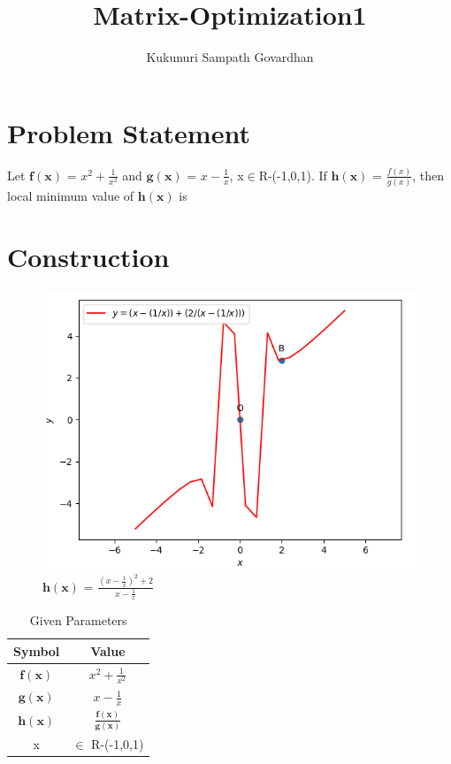 \documentclass[journal,12pt,twocolumn]{IEEEtran}
\title{
Matrix-Optimization1
}
\author{Kukunuri Sampath Govardhan}
\let\vec\mathbf
\begin{document}
\maketitle
\tableofcontents
\bigskip
\section{Problem Statement}
\begin{flushleft}
Let $\vec{f(x)}$ = $x^2+\frac{1}{x^2}$ and $\vec{g(x)}$ = $x-\frac{1}{x}$, x$\in$R-(-1,0,1). If $\vec{h(x)}$ = $\frac{f(x)}{g(x)}$, then local minimum value of $\vec{h(x)}$ is \\
\end{flushleft}
\section{Construction}
\begin{figure}[h]
	\centering
	\includegraphics[width=\columnwidth]{figs/fig7.png}
	\caption{$\vec{h(x)}$ = $\frac{(x-\frac{1}{x})^2 + 2}{x-\frac{1}{x}}$}
	\label{fig:my_label}
\end{figure}
\begin{table}[h]
    \centering
    \begin{tabular}{|c|c|}
       \hline
       \textbf{Symbol}&\textbf{Value}  \\
       \hline
	    $\vec{f(x)}$ & $x^2+\frac{1}{x^2}$ \\
        \hline
	    $\vec{g(x)}$ & $x-\frac{1}{x}$\\
        \hline
	    $\vec{h(x)}$ & $\frac{\vec{f(x)}}{\vec{g(x)}}$ \\
        \hline
        x & $\in$ R-(-1,0,1)\\
        \hline
    \end{tabular}
    \caption{Given Parameters}
    \label{tab:my_label}
\end{table}
\vspace{0.3cm}
\end{document}
